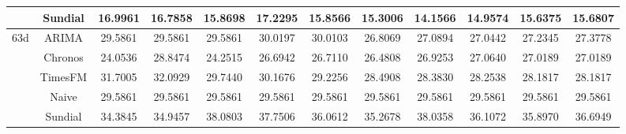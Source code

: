 \begin{table}[H]
{\begin{tabular}{cccccccccccc}
 & Sundial & 16.9961 & 16.7858 & 15.8698 & 17.2295 & 15.8566 & 15.3006 & 14.1566 & 14.9574 & 15.6375 & 15.6807 \\
\midrule
\multirow[c]{5}{*}{63d} & ARIMA & 29.5861 & 29.5861 & 29.5861 & 30.0197 & 30.0103 & 26.8069 & 27.0894 & 27.0442 & 27.2345 & 27.3778 \\
 & Chronos & 24.0536 & 28.8474 & 24.2515 & 26.6942 & 26.7110 & 26.4808 & 26.9253 & 27.0640 & 27.0189 & 27.0189 \\
 & TimesFM & 31.7005 & 32.0929 & 29.7440 & 30.1676 & 29.2256 & 28.4908 & 28.3830 & 28.2538 & 28.1817 & 28.1817 \\
 & Naive & 29.5861 & 29.5861 & 29.5861 & 29.5861 & 29.5861 & 29.5861 & 29.5861 & 29.5861 & 29.5861 & 29.5861 \\
 & Sundial & 34.3845 & 34.9457 & 38.0803 & 37.7506 & 36.0612 & 35.2678 & 38.0358 & 36.1072 & 35.8970 & 36.6949 \\
\bottomrule
\end{tabular}

 }
\end{table}